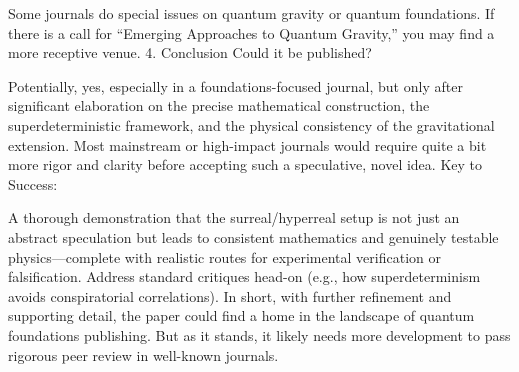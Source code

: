 Some journals do special issues on quantum gravity or quantum foundations. If there is a call for “Emerging Approaches to Quantum Gravity,” you may find a more receptive venue.
4. Conclusion
Could it be published?

Potentially, yes, especially in a foundations-focused journal, but only after significant elaboration on the precise mathematical construction, the superdeterministic framework, and the physical consistency of the gravitational extension.
Most mainstream or high-impact journals would require quite a bit more rigor and clarity before accepting such a speculative, novel idea.
Key to Success:

A thorough demonstration that the surreal/hyperreal setup is not just an abstract speculation but leads to consistent mathematics and genuinely testable physics—complete with realistic routes for experimental verification or falsification.
Address standard critiques head-on (e.g., how superdeterminism avoids conspiratorial correlations).
In short, with further refinement and supporting detail, the paper could find a home in the landscape of quantum foundations publishing. But as it stands, it likely needs more development to pass rigorous peer review in well-known journals.